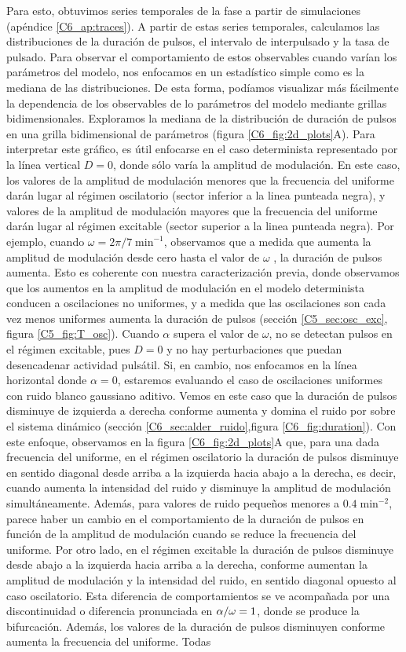 \documentclass[./main.tex]{subfiles}
\begin{document}
Para esto, obtuvimos series temporales de la fase a partir de simulaciones (apéndice \ref{C6_ap:traces}). A partir de estas series temporales, calculamos las distribuciones de la duración de pulsos, el intervalo de interpulsado y la tasa de pulsado. Para observar el comportamiento de estos observables cuando varían los parámetros del modelo, nos enfocamos en un estadístico simple como es la mediana de las distribuciones. De esta forma, podíamos visualizar más fácilmente la dependencia de los observables de lo parámetros del modelo mediante grillas bidimensionales. Exploramos la mediana de la distribución de duración de pulsos en una grilla bidimensional de parámetros (figura \ref{C6_fig:2d_plots}A). Para interpretar este gráfico, es útil enfocarse en el caso determinista representado por la línea vertical $D=0$, donde sólo varía la amplitud de modulación. En este caso, los valores de la amplitud de modulación menores que la frecuencia del uniforme darán lugar al régimen oscilatorio (sector inferior a la linea punteada negra), y valores de la amplitud de modulación mayores que la frecuencia del uniforme darán lugar al régimen excitable (sector superior a la linea punteada negra). Por ejemplo, cuando $\omega = 2\pi/7\; \text{min}^{-1}$, observamos que a medida que aumenta la amplitud de modulación desde cero hasta el valor de $\omega$ , la duración de pulsos aumenta. Esto es coherente con nuestra caracterización previa, donde observamos que los aumentos en la amplitud de modulación en el modelo determinista conducen a oscilaciones no uniformes, y a medida que las oscilaciones son cada vez menos uniformes aumenta la duración de pulsos (sección \ref{C5_sec:osc_exc}, figura \ref{C5_fig:T_osc}). Cuando $\alpha$ supera el valor de $\omega$, no se detectan pulsos en el régimen excitable, pues $D=0$ y no hay perturbaciones que puedan desencadenar actividad pulsátil. Si, en cambio, nos enfocamos en la línea horizontal donde $\alpha=0$, estaremos evaluando el caso de oscilaciones uniformes con ruido blanco gaussiano aditivo. Vemos en este caso que la duración de pulsos disminuye de izquierda a derecha conforme aumenta y domina el ruido por sobre el sistema dinámico (sección \ref{C6_sec:alder_ruido},figura \ref{C6_fig:duration}). Con este enfoque, observamos en la figura \ref{C6_fig:2d_plots}A que, para una dada frecuencia del uniforme, en el régimen oscilatorio la duración de pulsos disminuye en sentido diagonal desde arriba a la izquierda hacia abajo a la derecha, es decir, cuando aumenta la intensidad del ruido y disminuye la amplitud de modulación simultáneamente. Además, para valores de ruido pequeños menores a $0.4 \;\text{min}^{-2}$, parece haber un cambio en el comportamiento de la duración de pulsos en función de la amplitud de modulación cuando se reduce la frecuencia del uniforme. Por otro lado, en el régimen excitable la duración de pulsos disminuye desde abajo a la izquierda hacia arriba a la derecha, conforme aumentan la amplitud de modulación y la intensidad del ruido, en sentido diagonal opuesto al caso oscilatorio. Esta diferencia de comportamientos se ve acompañada por una discontinuidad o diferencia pronunciada en $\alpha/\omega = 1$, donde se produce la bifurcación. Además, los valores de la duración de pulsos disminuyen conforme aumenta la frecuencia del uniforme. Todas 
\end{document}
